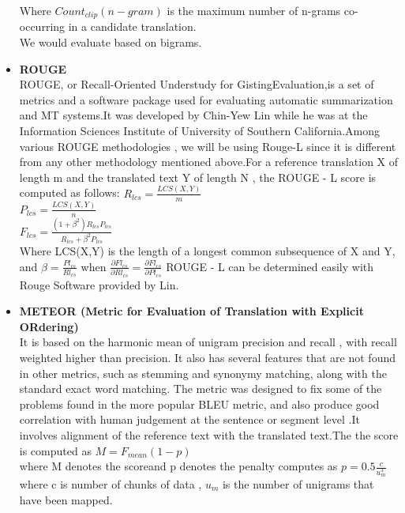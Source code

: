 \documentclass{article}
\begin{document}
\begin{itemize}
Where $Count_{clip}(n-gram)$ is the maximum number of n-grams co-occurring in a candidate translation.\\ We would evaluate based on bigrams.

\item \textbf{ROUGE}\\
ROUGE, or Recall-Oriented Understudy for GistingEvaluation,is a set of metrics and a software package used for evaluating automatic summarization and MT systems.It was developed by Chin-Yew Lin while he was at the Information Sciences Institute of University of Southern California.Among various ROUGE methodologies , we will be using Rouge-L since it is different from any other methodology mentioned above.For a reference translation X of length m and the translated text Y of length N , the ROUGE - L score is computed as follows:
$R_{lcs} = \frac {LCS(X,Y)}{m}$\\
$P_{lcs} = \frac { LCS (X,Y) }{n} $\\
$F_{lcs}=\frac { ( 1 + \beta^2 ) R_{lcs} P_{lcs} } { R_{lcs} + \beta^2 P_{lcs} }$\\ 
Where LCS(X,Y) is the length of a longest common subsequence of X and Y, and $\beta=\frac{ Pl_{cs}}{Rl_{cs}}$ when $ \frac{\partial Fl_{cs}}{\partial Rl_{cs}}=\frac{\partial Fl_{cs}}{\partial Pl_{cs}}$
ROUGE - L can be determined easily with Rouge Software provided by Lin.\\

\item \textbf{METEOR (Metric for Evaluation of Translation with Explicit ORdering)}\\
It is based on the harmonic mean of unigram precision and recall , with recall weighted higher than precision. It also has several features that are not found in other metrics, such as stemming and synonymy matching, along with the standard exact word matching. The metric was designed to fix some of the problems found in the more popular BLEU metric, and also produce good correlation with human judgement at the sentence or segment level .It involves alignment of the reference text with the translated text.The the score is computed as 
$M = F_{mean} ( 1 - p ) $\\
where M denotes the scoreand p denotes the penalty computes as
$ p = 0.5 \frac {c} { u _ {m} ^3} $  \\
where c is number of chunks of data , $u_{m}$ is the number of unigrams that have been mapped.
\end{itemize}
\end{document}
